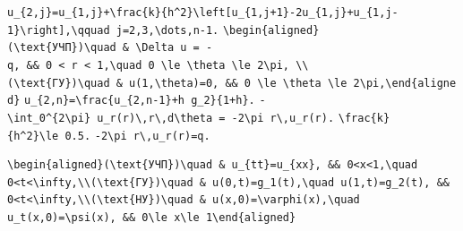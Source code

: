 \documentclass[
  ukrainian,
]{article}
\begin{document}
\texttt{u\_\{2,j\}=u\_\{1,j\}+\textbackslash{}frac\{k\}\{h\^{}2\}\textbackslash{}left{[}u\_\{1,j+1\}-2u\_\{1,j\}+u\_\{1,j-1\}\textbackslash{}right{]},\textbackslash{}qquad\ j=2,3,\textbackslash{}dots,n-1.}
\texttt{\textbackslash{}begin\{aligned\}(\textbackslash{}text\{УЧП\})\textbackslash{}quad\ \&\ \textbackslash{}Delta\ u\ =\ -q,\ \&\&\ 0\ \textless{}\ r\ \textless{}\ 1,\textbackslash{}quad\ 0\ \textbackslash{}le\ \textbackslash{}theta\ \textbackslash{}le\ 2\textbackslash{}pi,\ \textbackslash{}\textbackslash{}(\textbackslash{}text\{ГУ\})\textbackslash{}quad\ \&\ u(1,\textbackslash{}theta)=0,\ \&\&\ 0\ \textbackslash{}le\ \textbackslash{}theta\ \textbackslash{}le\ 2\textbackslash{}pi,\textbackslash{}end\{aligned\}}
\texttt{u\_\{2,n\}=\textbackslash{}frac\{u\_\{2,n-1\}+h\ g\_2\}\{1+h\}.}
\texttt{-\textbackslash{}int\_0\^{}\{2\textbackslash{}pi\}\ u\_r(r)\textbackslash{},r\textbackslash{},d\textbackslash{}theta\ =\ -2\textbackslash{}pi\ r\textbackslash{},u\_r(r).}
\texttt{\textbackslash{}frac\{k\}\{h\^{}2\}\textbackslash{}le\ 0.5.}
\texttt{-2\textbackslash{}pi\ r\textbackslash{},u\_r(r)=q.}

\begin{verbatim}
\begin{aligned}(\text{УЧП})\quad & u_{tt}=u_{xx}, && 0<x<1,\quad 0<t<\infty,\\(\text{ГУ})\quad & u(0,t)=g_1(t),\quad u(1,t)=g_2(t), && 0<t<\infty,\\(\text{НУ})\quad & u(x,0)=\varphi(x),\quad u_t(x,0)=\psi(x), && 0\le x\le 1\end{aligned}
\end{verbatim}
\end{document}
